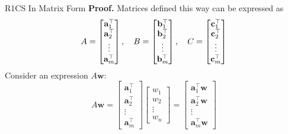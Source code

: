 \documentclass{beamer}
\begin{document}
    \begin{frame}{R1CS In Matrix Form}
        \textbf{Proof.} Matrices defined this way can be expressed as
        \vspace{-5pt}
        {\scriptsize \begin{equation*}
            A = \begin{bmatrix}
                \mathbf{a}_1^{\top} \\ \mathbf{a}_2^{\top} \\ \vdots \\ \mathbf{a}_m^{\top}
            \end{bmatrix}, \quad B = \begin{bmatrix}
                \mathbf{b}_1^{\top} \\ \mathbf{b}_2^{\top} \\ \vdots \\ \mathbf{b}_m^{\top}
            \end{bmatrix}, \quad C = \begin{bmatrix}
                \mathbf{c}_1^{\top} \\ \mathbf{c}_2^{\top} \\ \vdots \\ \mathbf{c}_m^{\top}
            \end{bmatrix}
            \vspace{-5pt}
        \end{equation*}}
        \pause
        Consider an expression $A\mathbf{w}$:
        \vspace{-5pt}
        {\scriptsize \begin{equation*}
            A\mathbf{w} = \begin{bmatrix}
                \mathbf{a}_1^{\top} \\ \mathbf{a}_2^{\top} \\ \vdots \\ \mathbf{a}_m^{\top}
            \end{bmatrix}\begin{bmatrix}
                w_1 \\ w_2 \\ \vdots \\ w_n
            \end{bmatrix} = \begin{bmatrix}
                \mathbf{a}_1^{\top}\mathbf{w} \\ \mathbf{a}_2^{\top}\mathbf{w} \\ \vdots \\ \mathbf{a}_m^{\top}\mathbf{w}

\end{bmatrix}
\end{equation*}}
\end{frame}
\end{document}
